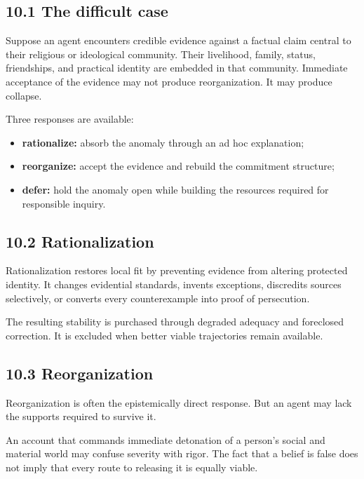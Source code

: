 \documentclass[
  11pt,
]{article}
\providecommand{\tightlist}{%
  \setlength{\itemsep}{0pt}\setlength{\parskip}{0pt}}
\begin{document}
\subsection{10.1 The difficult case}\label{the-difficult-case}

Suppose an agent encounters credible evidence against a factual claim
central to their religious or ideological community. Their livelihood,
family, status, friendships, and practical identity are embedded in that
community. Immediate acceptance of the evidence may not produce
reorganization. It may produce collapse.

Three responses are available:

\begin{itemize}
\tightlist
\item
  \textbf{rationalize:} absorb the anomaly through an ad hoc
  explanation;
\item
  \textbf{reorganize:} accept the evidence and rebuild the commitment
  structure;
\item
  \textbf{defer:} hold the anomaly open while building the resources
  required for responsible inquiry.
\end{itemize}

\subsection{10.2 Rationalization}\label{rationalization}

Rationalization restores local fit by preventing evidence from altering
protected identity. It changes evidential standards, invents exceptions,
discredits sources selectively, or converts every counterexample into
proof of persecution.

The resulting stability is purchased through degraded adequacy and
foreclosed correction. It is excluded when better viable trajectories
remain available.

\subsection{10.3 Reorganization}\label{reorganization}

Reorganization is often the epistemically direct response. But an agent
may lack the supports required to survive it.

An account that commands immediate detonation of a person's social and
material world may confuse severity with rigor. The fact that a belief
is false does not imply that every route to releasing it is equally
viable.
\end{document}
